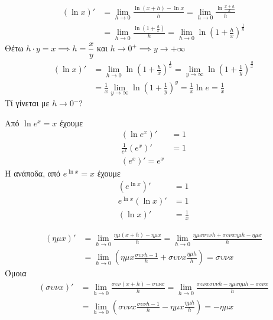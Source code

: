 \documentclass{presentation}
\begin{document}
\begin{apodiksi}[$(\ln x)'=\frac{1}{x}$]
  \begin{align*}
    (\ln x)' & =\lim\limits_{h \to 0}{ \frac{\ln (x+h) - \ln x}{h}}=\lim\limits_{h \to 0}{ \frac{\ln \frac{x+h}{x}}{h}}         \\
             & =\lim\limits_{h \to 0}{ \frac{\ln (1+\frac{h}{x})}{h}}=\lim\limits_{h \to 0}{ \ln (1+\frac{h}{x})^{\frac{1}{h}}}
  \end{align*}
  Θέτω $h\cdot y=x\implies h=\dfrac{x}{y}$ και $h\to 0^+ \implies y\to +\infty$
  \begin{align*}
    (\ln x)' & =\lim\limits_{h \to 0}{ \ln (1+\frac{h}{x})^{\frac{1}{h}}}=\lim\limits_{y \to \infty}{ \ln (1+\frac{1}{y})^{\frac{y}{x}}} \\
             & =\frac{1}{x}\lim\limits_{y \to \infty}{ \ln (1+\frac{1}{y})^y}=\frac{1}{x}\ln e=\frac{1}{x}
  \end{align*}
  Τί γίνεται με $h\to 0^-$?
  \hyperlink{Θεωρία}{}
\end{apodiksi}

\begin{apodiksi}
  Από $\ln e^x=x$ έχουμε
  \begin{align*}
    \left( \ln e^x \right)'          & =1 \\
    \frac{1}{e^x}\left( e^x \right)' & =1 \\
    \left( e^x \right)' = e^x
  \end{align*}
  Ή ανάποδα, από $e^{\ln x}=x$ έχουμε
  \begin{align*}
    \left( e^{\ln x} \right)'      & =1           \\
    e^{\ln x}\left( \ln x \right)' & =1           \\
    \left( \ln x \right)'          & =\frac{1}{x}
  \end{align*}
  \hyperlink{Θεωρία}{}
\end{apodiksi}

\begin{apodiksi}[$(ημx)'=συνx$ και $(συνx)'=-ημx$]
  \begin{align*}
    (ημ x)' & =\lim\limits_{h \to 0}{ \frac{ημ (x+h) - ημ x}{h}}=\lim\limits_{h \to 0}{ \frac{ημ x συν h + συν x ημ h - ημx}{h}} \\
            & =\lim\limits_{h \to 0}{ \left( ημx\frac{συνh-1}{h}+συνx\frac{ημh}{h} \right) }=συνx
  \end{align*}
  Όμοια
  \begin{align*}
    (συν x)' & =\lim\limits_{h \to 0}{ \frac{συν (x+h) - συν x}{h}}=\lim\limits_{h \to 0}{ \frac{συν x συν h - ημ x ημ h - συνx}{h}} \\
             & =\lim\limits_{h \to 0}{ \left( συνx\frac{συνh-1}{h}-ημx\frac{ημh}{h} \right) }=-ημx
  \end{align*}
  \hyperlink{Θεωρία}{}
\end{apodiksi}
\end{document}
